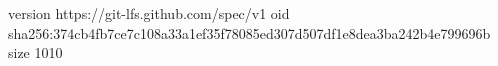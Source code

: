 version https://git-lfs.github.com/spec/v1
oid sha256:374cb4fb7ce7c108a33a1ef35f78085ed307d507df1e8dea3ba242b4e799696b
size 1010
